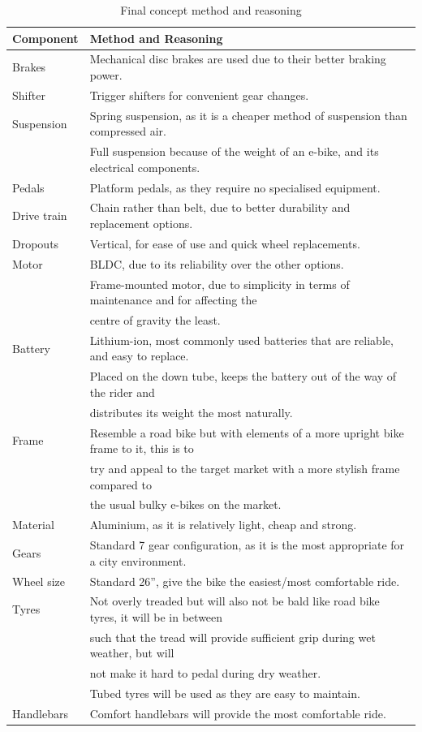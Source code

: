 \documentclass[a4paper,11pt]{article}
\begin{document}
\begingroup
\onehalfspacing
\begin{longtable}{l l}
	\caption{Final concept method and reasoning}\\
		\hline
		Component&Method and Reasoning\\\hline
		Brakes&Mechanical disc brakes are used due to their better braking power.\\
		Shifter&Trigger shifters for convenient gear changes.\\
		Suspension&Spring suspension, as it is a cheaper method of suspension than compressed air.\\
			  &Full suspension because of the weight of an e-bike, and its electrical components.\\ 
		Pedals&Platform pedals, as they require no specialised equipment.\\
		Drive train&Chain rather than belt, due to better durability and replacement options.\\ 
		Dropouts&Vertical, for ease of use and quick wheel replacements.\\
		Motor&BLDC, due to its reliability over the other options.\\
		     &Frame-mounted motor, due to simplicity in terms of maintenance and for affecting the\\
		     &\phantom{WW} centre of gravity the least.\\ 
		Battery&Lithium-ion, most commonly used batteries that are reliable, and easy to replace.\\
		       &Placed on the down tube, keeps the battery out of the way of the rider and \\
		       &\phantom{WW} distributes its weight the most naturally.\\
		Frame&Resemble a road bike but with elements of a more upright bike frame to it, this is to\\
		     &\phantom{WW} try and appeal to the target market with a more stylish frame compared to\\
		     &\phantom{WW} the usual bulky e-bikes on the market.\\
		Material&Aluminium, as it is relatively light, cheap and strong. \\
		Gears&Standard 7 gear configuration, as it is the most appropriate for a city environment.\\ 
		Wheel size&Standard 26'', give the bike the easiest/most comfortable ride.\\
		Tyres&Not overly treaded but will also not be bald like road bike tyres, it will be in between\\
		     &\phantom{WW} such that the tread will provide sufficient grip during wet weather, but will \\
		     &\phantom{WW} not make it hard to pedal during dry weather.\\
		     &Tubed tyres will be used as they are easy to maintain.\\
		Handlebars&Comfort handlebars will provide the most comfortable ride. 
\end{longtable}
\endgroup
\end{document}
